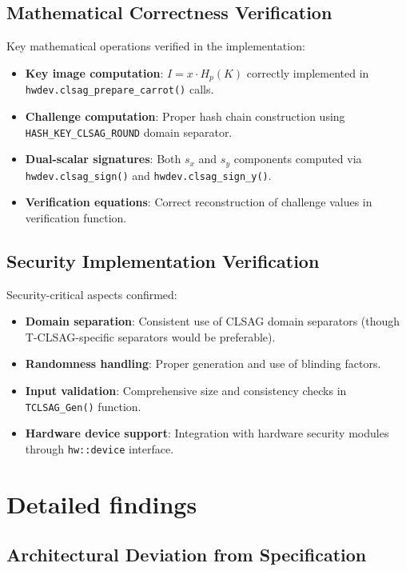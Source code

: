 \documentclass{article}
\begin{document}
\subsection{Mathematical Correctness Verification}
Key mathematical operations verified in the implementation:
\begin{itemize}
  \item \textbf{Key image computation}: $I = x \cdot H_p(K)$ correctly implemented 
        in \texttt{hwdev.clsag\_prepare\_carrot()} calls.
  \item \textbf{Challenge computation}: Proper hash chain construction using 
        \texttt{HASH\_KEY\_CLSAG\_ROUND} domain separator.
  \item \textbf{Dual-scalar signatures}: Both $s_x$ and $s_y$ components computed 
        via \texttt{hwdev.clsag\_sign()} and \texttt{hwdev.clsag\_sign\_y()}.
  \item \textbf{Verification equations}: Correct reconstruction of challenge values 
        in verification function.
\end{itemize}

\subsection{Security Implementation Verification}
Security-critical aspects confirmed:
\begin{itemize}
  \item \textbf{Domain separation}: Consistent use of CLSAG domain separators 
        (though T-CLSAG-specific separators would be preferable).
  \item \textbf{Randomness handling}: Proper generation and use of blinding factors.
  \item \textbf{Input validation}: Comprehensive size and consistency checks in 
        \texttt{TCLSAG\_Gen()} function.
  \item \textbf{Hardware device support}: Integration with hardware security modules 
        through \texttt{hw::device} interface.
\end{itemize}

\section{Detailed findings}

\subsection{Architectural Deviation from Specification}
\end{document}
